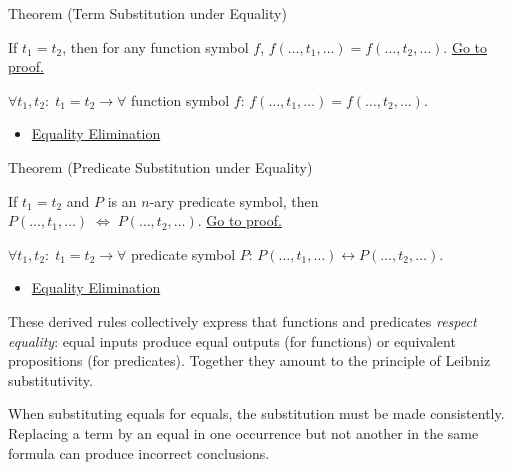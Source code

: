 \begin{theorembox}{Theorem (Term Substitution under Equality)}
\begin{theorem}\label{thm:eq-term}
If $t_1 = t_2$, then for any function symbol $f$,
$f(\dots,t_1,\dots) = f(\dots,t_2,\dots)$.
\hyperref[prf:eq-term]{Go to proof.}
\end{theorem}
\end{theorembox}

\begin{remark*}
$\forall t_1, t_2:\; t_1=t_2 \to \forall$ function symbol $f$: $f(\dots,t_1,\dots) = f(\dots,t_2,\dots)$.
\end{remark*}


\begin{dependencies}
\begin{itemize}
  \item \hyperref[def:eq-elim]{Equality Elimination}
\end{itemize}
\end{dependencies}

\begin{theorembox}{Theorem (Predicate Substitution under Equality)}
\begin{theorem}\label{thm:eq-pred}
If $t_1 = t_2$ and $P$ is an $n$-ary predicate symbol, then
$P(\dots,t_1,\dots) \;\Leftrightarrow\; P(\dots,t_2,\dots)$.
\hyperref[prf:eq-pred]{Go to proof.}
\end{theorem}
\end{theorembox}

\begin{remark*}
$\forall t_1, t_2:\; t_1=t_2 \to \forall$ predicate symbol $P$: $P(\dots,t_1,\dots) \leftrightarrow P(\dots,t_2,\dots)$.
\end{remark*}


\begin{dependencies}
\begin{itemize}
  \item \hyperref[def:eq-elim]{Equality Elimination}
\end{itemize}
\end{dependencies}

\begin{remark*}[Summary]
These derived rules collectively express that functions and predicates
\emph{respect equality}: equal inputs produce equal outputs (for functions) or
equivalent propositions (for predicates). Together they amount to the principle
of Leibniz substitutivity.
\end{remark*}

\begin{remark*}
When substituting equals for equals, the substitution must be made consistently.
Replacing a term by an equal in one occurrence but not another in the same
formula can produce incorrect conclusions.
\end{remark*}
